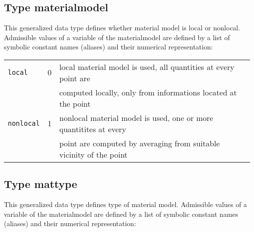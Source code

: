 \subsection{Type {\sf materialmodel}}
\label{sectmaterialmodel}

This generalized data type defines whether material model is local or nonlocal.
Admissible values of a variable of the {\sf materialmodel} are defined by a list of symbolic constant names (aliases)
and their numerical representation:

\begin{center}
\begin{tabular}{|l|c|l|}
\hline
{\tt local} & 0 & local material model is used, all quantities at every point are
\\
 & & computed locally, only from informations located at the point
\\ \hline
{\tt nonlocal} & 1 & nonlocal material model is used, one or more quantitites at every
\\
 & & point are computed by averaging from suitable vicinity of the point
\\ \hline
\end{tabular}
\end{center}

\subsection{Type {\sf mattype}}
\label{sectmattype}

This generalized data type defines type of material model.
Admissible values of a variable of the {\sf materialmodel} are defined by a list of symbolic constant names (aliases)
and their numerical representation:

